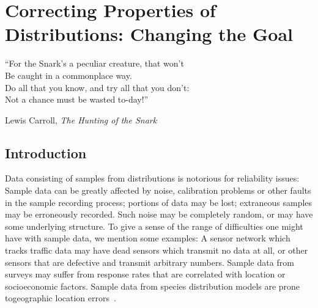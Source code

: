 \chapter{Correcting Properties of Distributions: Changing the Goal}\label{chap:correction}

\epigraph{``For the Snark's a peculiar creature, that won't\\
Be caught in a commonplace way.\\
Do all that you know, and try all that you don't:\\
Not a chance must be wasted to-day!''}{Lewis Carroll, \textit{The Hunting of the Snark}}



\section{Introduction}
	
Data consisting of samples from distributions is notorious for reliability issues:  Sample data can be greatly affected by noise, calibration problems or other faults in the sample recording process;
portions of data may be lost; extraneous samples may be erroneously recorded. Such noise may be completely random, or may have some underlying structure. To give a sense
of the range of difficulties one might have with sample data, we mention some examples: A sensor network which tracks traffic data may have dead sensors  which transmit no data at all, or other sensors that are defective and transmit arbitrary numbers. Sample data
from surveys may suffer from response  rates that are correlated  with location or socioeconomic factors. Sample data from species distribution models are prone togeographic location errors~\cite{HBTB:14}.

